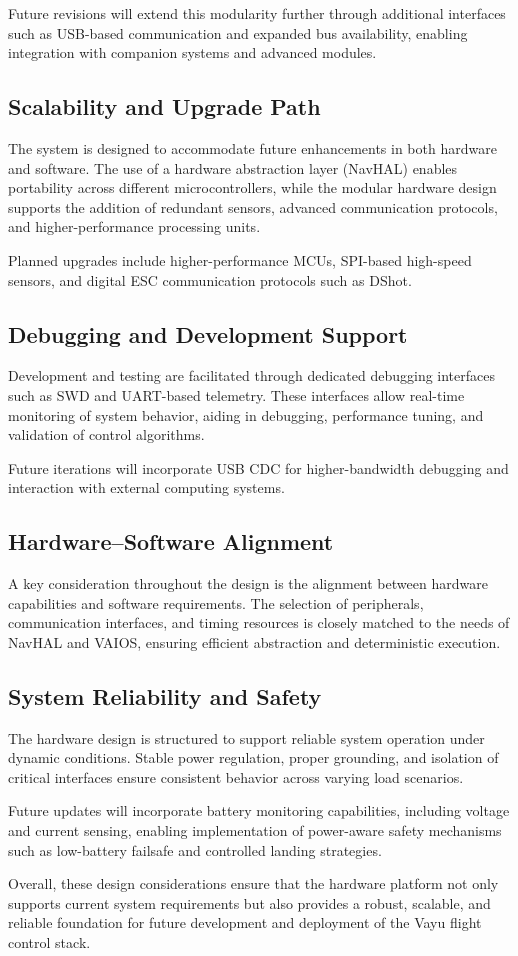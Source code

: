 Future revisions will extend this modularity further through additional interfaces such as USB-based communication and expanded bus availability, enabling integration with companion systems and advanced modules.

\subsection{Scalability and Upgrade Path}

The system is designed to accommodate future enhancements in both hardware and software. The use of a hardware abstraction layer (NavHAL) enables portability across different microcontrollers, while the modular hardware design supports the addition of redundant sensors, advanced communication protocols, and higher-performance processing units.

Planned upgrades include higher-performance MCUs, SPI-based high-speed sensors, and digital ESC communication protocols such as DShot.

\subsection{Debugging and Development Support}

Development and testing are facilitated through dedicated debugging interfaces such as SWD and UART-based telemetry. These interfaces allow real-time monitoring of system behavior, aiding in debugging, performance tuning, and validation of control algorithms.

Future iterations will incorporate USB CDC for higher-bandwidth debugging and interaction with external computing systems.

\subsection{Hardware–Software Alignment}

A key consideration throughout the design is the alignment between hardware capabilities and software requirements. The selection of peripherals, communication interfaces, and timing resources is closely matched to the needs of NavHAL and VAIOS, ensuring efficient abstraction and deterministic execution.

\subsection{System Reliability and Safety}

The hardware design is structured to support reliable system operation under dynamic conditions. Stable power regulation, proper grounding, and isolation of critical interfaces ensure consistent behavior across varying load scenarios.

Future updates will incorporate battery monitoring capabilities, including voltage and current sensing, enabling implementation of power-aware safety mechanisms such as low-battery failsafe and controlled landing strategies.

Overall, these design considerations ensure that the hardware platform not only supports current system requirements but also provides a robust, scalable, and reliable foundation for future development and deployment of the Vayu flight control stack.